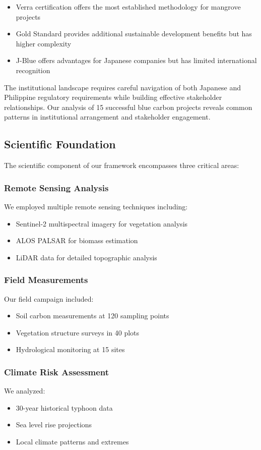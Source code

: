 \documentclass{article}
\theoremstyle{plain}
\theoremstyle{definition}
\theoremstyle{remark}
\begin{document}
\begin{itemize}
\item Verra certification offers the most established methodology for mangrove projects
\item Gold Standard provides additional sustainable development benefits but has higher complexity
\item J-Blue offers advantages for Japanese companies but has limited international recognition
\end{itemize}

The institutional landscape requires careful navigation of both Japanese and Philippine regulatory requirements while building effective stakeholder relationships. Our analysis of 15 successful blue carbon projects reveals common patterns in institutional arrangement and stakeholder engagement.

\subsection{Scientific Foundation}
The scientific component of our framework encompasses three critical areas:

\subsubsection{Remote Sensing Analysis}
We employed multiple remote sensing techniques including:
\begin{itemize}
\item Sentinel-2 multispectral imagery for vegetation analysis
\item ALOS PALSAR for biomass estimation
\item LiDAR data for detailed topographic analysis
\end{itemize}

\subsubsection{Field Measurements}
Our field campaign included:
\begin{itemize}
\item Soil carbon measurements at 120 sampling points
\item Vegetation structure surveys in 40 plots
\item Hydrological monitoring at 15 sites
\end{itemize}

\subsubsection{Climate Risk Assessment}
We analyzed:
\begin{itemize}
\item 30-year historical typhoon data
\item Sea level rise projections
\item Local climate patterns and extremes
\end{itemize}
\end{document}
